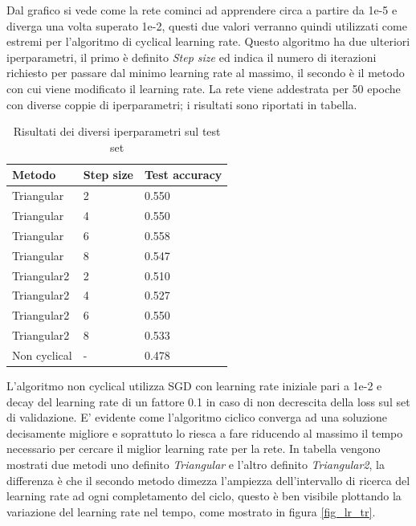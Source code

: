 \newpage
Dal grafico si vede come la rete cominci ad apprendere circa a partire da 1e-5 e diverga una volta superato 1e-2, questi due valori verranno quindi utilizzati come estremi per l'algoritmo di cyclical learning rate.
Questo algoritmo ha due ulteriori iperparametri, il primo è definito \textit{Step size} ed indica il numero di iterazioni richiesto per passare dal minimo learning rate al massimo, il secondo è il metodo con cui viene modificato il learning rate.
La rete viene addestrata per 50 epoche con diverse coppie di iperparametri; i risultati sono riportati in tabella.
\begin{table}[H]
\centering
\caption{Risultati dei diversi iperparametri sul test set}
\begin{tabular}{|l|l|l|}
\hline
Metodo       & Step size & Test accuracy \\ \hline
Triangular   & 2         & 0.550         \\ \hline
Triangular   & 4         & 0.550         \\ \hline
Triangular   & 6         & 0.558         \\ \hline
Triangular   & 8         & 0.547         \\ \hline
Triangular2  & 2         & 0.510         \\ \hline
Triangular2  & 4         & 0.527         \\ \hline
Triangular2  & 6         & 0.550         \\ \hline
Triangular2  & 8         & 0.533         \\ \hline
Non cyclical & -         & 0.478         \\ \hline
\end{tabular}
\label{t_clr}
\end{table}
L'algoritmo non cyclical utilizza SGD con learning rate iniziale pari a 1e-2 e decay del learning rate di un fattore 0.1 in caso di non decrescita della loss sul set di validazione. E' evidente come l'algoritmo ciclico converga ad una soluzione decisamente migliore e soprattuto lo riesca a fare riducendo al massimo il tempo necessario per cercare il miglior learning rate per la rete.
In tabella vengono mostrati due metodi uno definito \textit{Triangular} e l'altro definito \textit{Triangular2}, la differenza è che il secondo metodo dimezza l'ampiezza dell'intervallo di ricerca del learning rate ad ogni completamento del ciclo, questo è ben visibile plottando la variazione del learning rate nel tempo, come mostrato in figura \ref{fig_lr_tr}.

